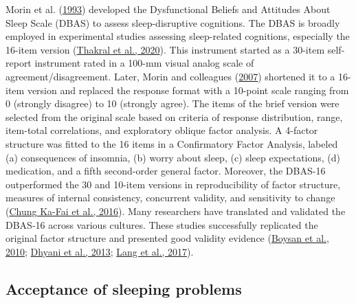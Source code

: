 \documentclass[
  ,doc,11pt, twoside,floatsintext]{apa6}
\begin{document}
Morin et al. (\protect\hyperlink{ref-morin1993insomnia}{1993}) developed the Dysfunctional Beliefs and Attitudes About Sleep Scale (DBAS) to assess sleep-disruptive cognitions. The DBAS is broadly employed in experimental studies assessing sleep-related cognitions, especially the 16-item version (\protect\hyperlink{ref-thakral2020}{Thakral et al., 2020}). This instrument started as a 30-item self-report instrument rated in a 100-mm visual analog scale of agreement/disagreement. Later, Morin and colleagues (\protect\hyperlink{ref-morin2007a}{2007}) shortened it to a 16-item version and replaced the response format with a 10-point scale ranging from 0 (strongly disagree) to 10 (strongly agree). The items of the brief version were selected from the original scale based on criteria of response distribution, range, item-total correlations, and exploratory oblique factor analysis. A 4-factor structure was fitted to the 16 items in a Confirmatory Factor Analysis, labeled (a) consequences of insomnia, (b) worry about sleep, (c) sleep expectations, (d) medication, and a fifth second-order general factor. Moreover, the DBAS-16 outperformed the 30 and 10-item versions in reproducibility of factor structure, measures of internal consistency, concurrent validity, and sensitivity to change (\protect\hyperlink{ref-chungka-fai2016}{Chung Ka-Fai et al., 2016}). Many researchers have translated and validated the DBAS-16 across various cultures. These studies successfully replicated the original factor structure and presented good validity evidence (\protect\hyperlink{ref-boysan2010}{Boysan et al., 2010}; \protect\hyperlink{ref-dhyani2013}{Dhyani et al., 2013}; \protect\hyperlink{ref-lang2017}{Lang et al., 2017}).

\hypertarget{acceptance-of-sleeping-problems}{%
\subsection{Acceptance of sleeping problems}\label{acceptance-of-sleeping-problems}}
\end{document}

